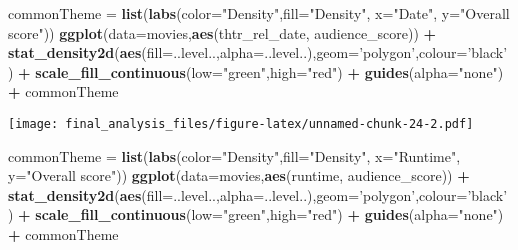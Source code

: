 \documentclass[]{article}
\newenvironment{Shaded}{\begin{snugshade}}{\end{snugshade}}
\newcommand{\DataTypeTok}[1]{\textcolor[rgb]{0.13,0.29,0.53}{#1}}
\newcommand{\KeywordTok}[1]{\textcolor[rgb]{0.13,0.29,0.53}{\textbf{#1}}}
\newcommand{\NormalTok}[1]{#1}
\newcommand{\OperatorTok}[1]{\textcolor[rgb]{0.81,0.36,0.00}{\textbf{#1}}}
\newcommand{\StringTok}[1]{\textcolor[rgb]{0.31,0.60,0.02}{#1}}
\begin{document}
\begin{Shaded}
\begin{Highlighting}[]
\NormalTok{commonTheme =}\StringTok{ }\KeywordTok{list}\NormalTok{(}\KeywordTok{labs}\NormalTok{(}\DataTypeTok{color=}\StringTok{"Density"}\NormalTok{,}\DataTypeTok{fill=}\StringTok{"Density"}\NormalTok{, }\DataTypeTok{x=}\StringTok{"Date"}\NormalTok{, }\DataTypeTok{y=}\StringTok{"Overall score"}\NormalTok{))}
\KeywordTok{ggplot}\NormalTok{(}\DataTypeTok{data=}\NormalTok{movies,}\KeywordTok{aes}\NormalTok{(thtr_rel_date, audience_score)) }\OperatorTok{+}\StringTok{ }
\StringTok{  }\KeywordTok{stat_density2d}\NormalTok{(}\KeywordTok{aes}\NormalTok{(}\DataTypeTok{fill=}\NormalTok{..level..,}\DataTypeTok{alpha=}\NormalTok{..level..),}\DataTypeTok{geom=}\StringTok{'polygon'}\NormalTok{,}\DataTypeTok{colour=}\StringTok{'black'}\NormalTok{) }\OperatorTok{+}\StringTok{ }
\StringTok{  }\KeywordTok{scale_fill_continuous}\NormalTok{(}\DataTypeTok{low=}\StringTok{"green"}\NormalTok{,}\DataTypeTok{high=}\StringTok{"red"}\NormalTok{) }\OperatorTok{+}
\StringTok{  }\KeywordTok{guides}\NormalTok{(}\DataTypeTok{alpha=}\StringTok{"none"}\NormalTok{) }\OperatorTok{+}
\StringTok{  }\NormalTok{commonTheme}
\end{Highlighting}
\end{Shaded}

\texttt{[image: final\_analysis\_files/figure-latex/unnamed-chunk-24-2.pdf]}

\begin{Shaded}
\begin{Highlighting}[]
\NormalTok{commonTheme =}\StringTok{ }\KeywordTok{list}\NormalTok{(}\KeywordTok{labs}\NormalTok{(}\DataTypeTok{color=}\StringTok{"Density"}\NormalTok{,}\DataTypeTok{fill=}\StringTok{"Density"}\NormalTok{, }\DataTypeTok{x=}\StringTok{"Runtime"}\NormalTok{, }\DataTypeTok{y=}\StringTok{"Overall score"}\NormalTok{))}
\KeywordTok{ggplot}\NormalTok{(}\DataTypeTok{data=}\NormalTok{movies,}\KeywordTok{aes}\NormalTok{(runtime, audience_score)) }\OperatorTok{+}\StringTok{ }
\StringTok{  }\KeywordTok{stat_density2d}\NormalTok{(}\KeywordTok{aes}\NormalTok{(}\DataTypeTok{fill=}\NormalTok{..level..,}\DataTypeTok{alpha=}\NormalTok{..level..),}\DataTypeTok{geom=}\StringTok{'polygon'}\NormalTok{,}\DataTypeTok{colour=}\StringTok{'black'}\NormalTok{) }\OperatorTok{+}\StringTok{ }
\StringTok{  }\KeywordTok{scale_fill_continuous}\NormalTok{(}\DataTypeTok{low=}\StringTok{"green"}\NormalTok{,}\DataTypeTok{high=}\StringTok{"red"}\NormalTok{) }\OperatorTok{+}
\StringTok{  }\KeywordTok{guides}\NormalTok{(}\DataTypeTok{alpha=}\StringTok{"none"}\NormalTok{) }\OperatorTok{+}
\StringTok{   }\NormalTok{commonTheme}
\end{Highlighting}
\end{Shaded}
\end{document}
